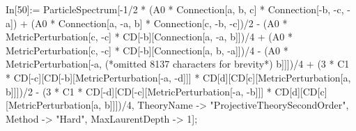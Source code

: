 In[50]:= ParticleSpectrum[-1/2 * (A0 * Connection[a, b, c] * Connection[-b, -c, -a]) + (A0 * Connection[a, -a, b] * Connection[c, -b, -c])/2 - (A0 * MetricPerturbation[c, -c] * CD[-b][Connection[a, -a, b]])/4 + (A0 * MetricPerturbation[c, -c] * CD[-b][Connection[a, b, -a]])/4 - (A0 * MetricPerturbation[-a, (*omitted 8137 characters for brevity*) b]]])/4 + (3 * C1 * CD[-c][CD[-b][MetricPerturbation[-a, -d]]] * CD[d][CD[c][MetricPerturbation[a, b]]])/2 - (3 * C1 * CD[-d][CD[-c][MetricPerturbation[-a, -b]]] * CD[d][CD[c][MetricPerturbation[a, b]]])/4, TheoryName -> "ProjectiveTheorySecondOrder", Method -> "Hard", MaxLaurentDepth -> 1];